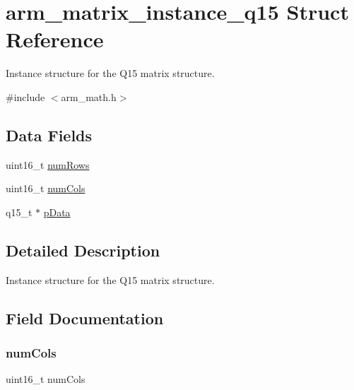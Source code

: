 \hypertarget{structarm__matrix__instance__q15}{}\section{arm\+\_\+matrix\+\_\+instance\+\_\+q15 Struct Reference}
\label{structarm__matrix__instance__q15}


Instance structure for the Q15 matrix structure.  




{\ttfamily \#include $<$arm\+\_\+math.\+h$>$}

\subsection*{Data Fields}
\begin{DoxyCompactItemize}
\item 
uint16\+\_\+t \hyperlink{structarm__matrix__instance__q15_a1bcf80ccdc2acc29198f1592ae300390}{num\+Rows}
\item 
uint16\+\_\+t \hyperlink{structarm__matrix__instance__q15_a4bb5ec0d13eb4c9cf887aa8366a44117}{num\+Cols}
\item 
q15\+\_\+t $\ast$ \hyperlink{structarm__matrix__instance__q15_a817ede38365e63e561a12069c6c5c087}{p\+Data}
\end{DoxyCompactItemize}


\subsection{Detailed Description}
Instance structure for the Q15 matrix structure. 

\subsection{Field Documentation}
\mbox{\label{structarm__matrix__instance__q15_a4bb5ec0d13eb4c9cf887aa8366a44117}} 
\subsubsection{\texorpdfstring{num\+Cols}{numCols}}
{\footnotesize\ttfamily uint16\+\_\+t num\+Cols}

